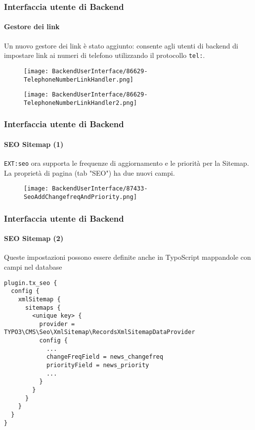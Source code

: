 
\begin{frame}[fragile]
	\frametitle{Interfaccia utente di Backend}
	\framesubtitle{Gestore dei link}

	Un nuovo gestore dei link è stato aggiunto: consente agli utenti di backend di impostare link ai numeri di
	    telefono utilizzando il protocollo \texttt{tel:}.

	\begin{figure}
		\texttt{[image: BackendUserInterface/86629-TelephoneNumberLinkHandler.png]}
	\end{figure}

	\begin{figure}
		\texttt{[image: BackendUserInterface/86629-TelephoneNumberLinkHandler2.png]}
	\end{figure}

\end{frame}


\begin{frame}[fragile]
	\frametitle{Interfaccia utente di Backend}
	\framesubtitle{SEO Sitemap (1)}

	\texttt{EXT:seo} ora supporta le frequenze di aggiornamento e le priorità per la Sitemap.
	La proprietà di pagina (tab "SEO") ha due nuovi campi.

	\begin{figure}
		\texttt{[image: BackendUserInterface/87433-SeoAddChangefreqAndPriority.png]}
	\end{figure}

\end{frame}


\begin{frame}[fragile]
	\frametitle{Interfaccia utente di Backend}
	\framesubtitle{SEO Sitemap (2)}

	\lstset{basicstyle=\tiny\ttfamily}

	Queste impostazioni possono essere definite anche in TypoScript mappandole con campi nel database

	\begin{lstlisting}
plugin.tx_seo {
  config {
    xmlSitemap {
      sitemaps {
        <unique key> {
          provider = TYPO3\CMS\Seo\XmlSitemap\RecordsXmlSitemapDataProvider
          config {
            ...
            changeFreqField = news_changefreq
            priorityField = news_priority
            ...
          }
        }
      }
    }
  }
}
	\end{lstlisting}

\end{frame}

